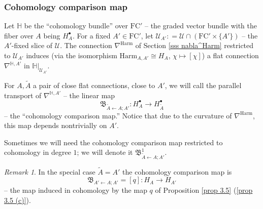 \documentclass[11pt,a4paper]{amsart}
\theoremstyle{plain} %
\theoremstyle{definition}
\theoremstyle{remark}
\newtheorem{rem}[thm]{Remark}
\newcommand{\mr}{\mathrm}
\newcommand{\bt}{\bullet}
\newcommand{\ra}{\rightarrow}
\newcommand{\til}{\widetilde}
\newcommand{\mc}{\mathcal}
\newcommand{\FC}{\mathrm{FC}}
\newcommand{\la}{\leftarrow}
\newcommand{\BB}{\mathfrak{B}}
\begin{document}
{\subsubsection{Cohomology comparison map}\label{sss cohomology comparison map}
Let $\mathbb{H}$ be the ``cohomology bundle'' over $\FC'$ -- the graded vector bundle with the fiber over $A$ being $H^\bt_{A}$. For a fixed $A'\in \FC'$, let 
$\mc{U}_{A'}\colon=\mc{U}\cap (\FC'\times\{A'\})$ -- the $A'$-fixed slice of $\mc{U}$.
The connection $\nabla^\mr{Harm}$ of Section \ref{sss nabla^Harm} restricted to $\mc{U}_{A'}$ induces (via the isomorphism $\mr{Harm}_{A,A'}\cong H_{A}$, $\chi\mapsto [\chi]$) a flat connection $\nabla^{\mathbb{H},A'}$ in $\mathbb{H}|_{\mc{U}_{A'}}$.

For $A,\til{A}$ a pair of close flat connections, close to $A'$, we will call the parallel transport of $\nabla^{\mathbb{H},A'}$ -- the linear map 
\begin{equation}\label{cohomology comparison map}
\BB_{\til{A}\leftarrow A;A'}\colon H^\bt_{A}\ra H^\bt_{\til{A}}
\end{equation}
-- the ``cohomology comparison map.'' Notice that due to the curvature of $\nabla^\mr{Harm}$, this map depends nontrivially on $A'$. 


Sometimes we will need the cohomology comparison map restricted to cohomology in degree $1$; we will denote it $\BB^1_{\til{A}\la A;A'}$.

\begin{rem}
In the special case $\til{A}=A'$ the cohomology comparison map is
 $$\BB_{A'\la A;A'}=[q]\colon H_{A}\ra H_{A'}$$
 -- the map induced in cohomology by the map $q$ of Proposition \ref{prop 3.5} (\ref{prop 3.5 (c)}).
\end{rem}
}
\end{document}
